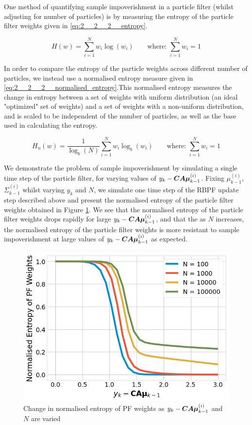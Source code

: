 \documentclass[../main.tex]{subfiles}
\begin{document}
One method of quantifying sample impoverishment in a particle filter (whilst adjusting for number of particles) is by measuring the entropy of the particle filter weights given in \autoref{eq:2__2__2__entropy}. 

\begin{equation}
	H(w) = \sum_{i=1}^N w_i \log(w_i)  \qquad \text{where: } \sum_{i=1}^N w_i = 1 \label{eq:2__2__2__entropy}
\end{equation}

In order to compare the entropy of the particle weights across different number of particles, we instead use a normalised entropy measure given in \autoref{eq:2__2__2__normalised_entropy}.This normalised entropy measures the change in entropy between a set of weights with uniform distribution (an ideal "optimized" set of weights) and a set of weights with a non-uniform distribution, and is scaled to be independent of the number of particles, as well as the base used in calculating the entropy.

\begin{equation}
H_n(w) = \frac{1}{\log_b(N)}\sum_{i=1}^N w_i \log_b(w_i)  \qquad \text{where: } \sum_{i=1}^N w_i = 1   \label{eq:2__2__2__normalised_entropy}
\end{equation}

We demonstrate the problem of sample impoverishment by simulating a single time step of the particle filter, for varying values of $y_k - \bm{CA\mu}_{k-1}^{(i)}$. Fixing $\mu_{k-1}^{(i)}$, $\Sigma_{k-1}^{(i)}$ whilst varying $y_k$ and $N$, we simulate one time step of the RBPF update step described above and present the normalised entropy of the particle filter weights obtained in Figure \ref{fig:2__2__2__sample_impoverishment}. We see that the normalised entropy of the particle filter weights drops rapidly for large $y_k - \bm{CA\mu}_{k-1}^{(i)}$, and that the as $N$ increases, the normalised entropy of the particle filter weights is more resistant to sample impoverishment at large values of $y_k - \bm{CA\mu}_{k-1}^{(i)}$ as expected. 

\begin{figure}[h!]
	\centering
	\includegraphics[width=12.0cm]{../plots/2__2__2__sample_impoverishment.png}
	\caption{Change in normalised entropy of PF weights as $y_k - \bm{CA\mu}_{k-1}^{(i)}$ and $N$ are varied}
	\label{fig:2__2__2__sample_impoverishment}
\end{figure}
\end{document}
